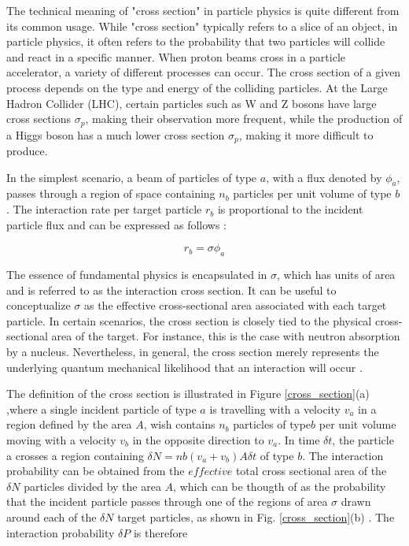The technical meaning of "cross section" in particle physics is quite different from its common usage. While "cross section" typically refers to a slice of an object, in particle physics, it often refers to the probability that two particles will collide and react in a specific manner. When proton beams cross in a particle accelerator, a variety of different processes can occur. The cross section of a given process depends on the type and energy of the colliding particles.
At the Large Hadron Collider (LHC), certain particles such as W and Z bosons have large cross sections $\sigma_{p}$, making their observation more frequent, while the production of a Higgs boson has a much lower cross section $\sigma_{p}$, making it more difficult to produce.

In the simplest scenario, a beam of particles of type $a$, with a flux denoted by $\phi_{a}$, passes through a region of space containing $n_{b}$ particles per unit volume of type $b$. The interaction rate per target particle $r_{b}$ is proportional to the incident particle flux and can be expressed as follows \cite{thomson_2013}:

\begin{equation*}
  r_{b}=\sigma \phi_{a}
\end{equation*}

The essence of fundamental physics is encapsulated in $\sigma$, which has units of area and is referred to as the interaction cross section. It can be useful to conceptualize $\sigma$ as the effective cross-sectional area associated with each target particle. In certain scenarios, the cross section is closely tied to the physical cross-sectional area of the target. For instance, this is the case with neutron absorption by a nucleus. Nevertheless, in general, the cross section merely represents the underlying quantum mechanical likelihood that an interaction will occur \cite{thomson_2013}.

The definition of the cross section is illustrated in Figure \ref{cross_section}(a) ,where a single incident particle of type $a$ is travelling with a velocity $v_{a}$ in a region defined by the area $A$, wish contains $n_{b}$ particles of type$ b$ per unit volume moving with a velocity $v_{b}$ in the opposite direction to $v_{a}$.
In  time $\delta t$, the particle a crosses a region containing $\delta N= nb(v_{a}+v_{b}) A \delta t$ of type $b$. The interaction probability can be obtained from the $effective$ total cross sectional area of the $\delta N$ particles divided by the area $A$, which can be thougth of as the probability that the incident particle passes through one of the regions of area $\sigma$ drawn around each of the $\delta N$ target particles, as shown in Fig. \ref{cross_section}(b) \cite{thomson_2013}. The interaction probability $\delta P$ is therefore

